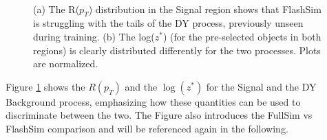 \begin{figure}
    \myfloatalign
    \\
    \caption[Angular distributions]{ (a) The R($p_T$) distribution in the Signal region shows that FlashSim is struggling with the tails of the DY process, previously unseen during training. (b) The log($z^*$) (for the pre-selected objects in both regions) is clearly distributed differently for the two processes. Plots are normalized.}\label{fig:angulardist}
\end{figure}

Figure \ref{fig:angulardist} shows the $R(p_T)$ and the $\log(z^*)$ for the Signal and the DY Background process, emphasizing how these quantities can be used to discriminate between the two. The Figure also introduces the FullSim vs FlashSim comparison and will be referenced again in the following.

